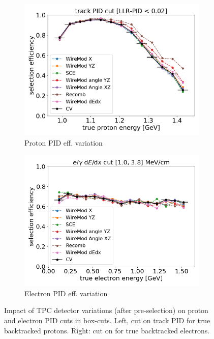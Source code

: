 \begin{figure}[H] 
\begin{center}
    \begin{subfigure}[b]{0.4\textwidth}
    \centering
    \includegraphics[width=1.00\textwidth]{detsys/PID/proton_e_03292020_eff_trkpid_nues.pdf}
    \caption{\label{fig:detsys:pid:proton} Proton PID eff. variation}
    \end{subfigure}
    \begin{subfigure}[b]{0.4\textwidth}
    \centering
    \includegraphics[width=1.00\textwidth]{detsys/PID/elec_e_03312020_eff_11_nue_pdf.png}
    \caption{\label{fig:detsys:pid:electron}Electron PID eff. variation}
    \end{subfigure}
\caption{\label{fig:syst:detsys:pid}Impact of TPC detector variations (after \npsel pre-selection) on proton and electron PID cuts in \npsel box-cuts. Left, cut on track PID for true backtracked protons. Right: cut on \dedx for true backtracked electrons.}
\end{center}
\end{figure}

